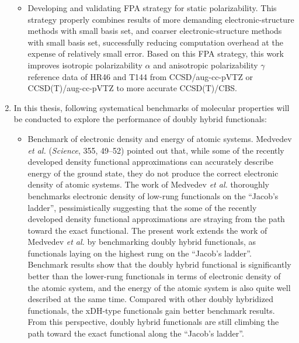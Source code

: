 \begin{abstract*}
\begin{enumerate}[nosep]
\begin{itemize}[nosep]
    \item Developing and validating FPA strategy for static polarizability. This strategy properly combines results of more demanding elec\-tronic-structure methods with small basis set, and coarser electronic-struc\-ture methods with small basis set, successfully reducing computation overhead at the expense of relatively small error. Based on this FPA strategy, this work improves isotropic polarizability $\alpha$ and anisotropic polarizability $\gamma$ reference data of HR46 and T144 from CCSD/aug-cc-pVTZ or CCSD(T)/aug-cc-pVTZ to more accurate CCSD(T)/CBS.
\end{itemize}
\item In this thesis, following systematical benchmarks of molecular properties will be conducted to explore the performance of doubly hybrid functionals:
\begin{itemize}[nosep]
    \item Benchmark of electronic density and energy of atomic systems. Medvedev \textit{et al.} (\emph{Science}, 355, 49--52) pointed out that, while some of the recently developed density functional approximations can accurately describe energy of the ground state, they do not produce the correct electronic density of atomic systems. The work of Medvedev \textit{et al.} thoroughly benchmarks electronic density of low-rung functionals on the ``Jacob's ladder'', pessimistically suggesting that the some of the recently developed density functional approximations are straying from the path toward the exact functional. The present work extends the work of Medvedev \textit{et al.} by benchmarking doubly hybrid functionals, as functionals laying on the highest rung on the ``Jacob's ladder''. Benchmark results show that the doubly hybrid functional is significantly better than the lower-rung functionals in terms of electronic density of the atomic system, and the energy of the atomic system is also quite well described at the same time. Compared with other doubly hybridized functionals, the xDH-type functionals gain better benchmark results. From this perspective, doubly hybrid functionals are still climbing the path toward the exact functional along the ``Jacob's ladder''.

\end{itemize}
\end{enumerate}
\end{abstract*}
